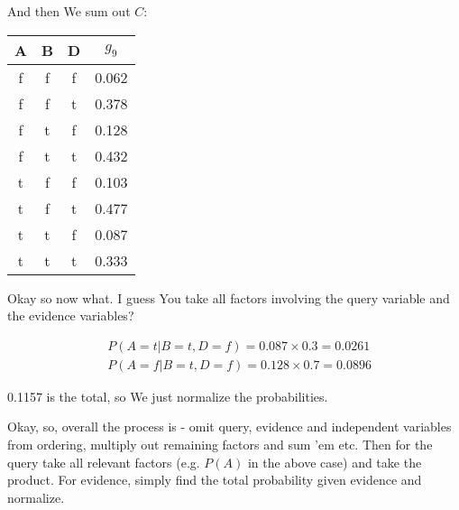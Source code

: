 \documentclass{article}
\begin{document}
			And then We sum out $C$:
						
			
			\begin{center}
				\begin{tabular}{ |c|c|c|c|  } 
					\hline
					A& B & D & $g_9$\\
					\hline 
					f & f  & f & 0.062 \\
					f & f  & t & 0.378 \\
					f & t  & f & 0.128 \\
					f & t  & t & 0.432 \\
					t & f  & f & 0.103 \\
					t & f  & t & 0.477 \\
					t & t  & f & 0.087 \\
					t & t  & t & 0.333 \\
					\hline
				\end{tabular}
			\end{center}
			
			Okay so now what. I guess You take all factors involving the query variable and the evidence variables? 
			
			\begin{align}
				&P(A=t|B=t, D=f) = 0.087\times 0.3 = 0.0261\\
				&P(A=f|B=t, D=f) = 0.128\times 0.7 = 0.0896
			\end{align}
			
			0.1157 is the total, so We just normalize the probabilities. 
			
			Okay, so, overall the process is - omit query, evidence and independent variables from ordering, multiply out remaining factors and sum 'em etc. Then for the query take all relevant factors (e.g. $P(A)$ in the above case) and take the product. For evidence, simply find the total probability given evidence and normalize.
			
			
			
			
			
			
\end{document}
